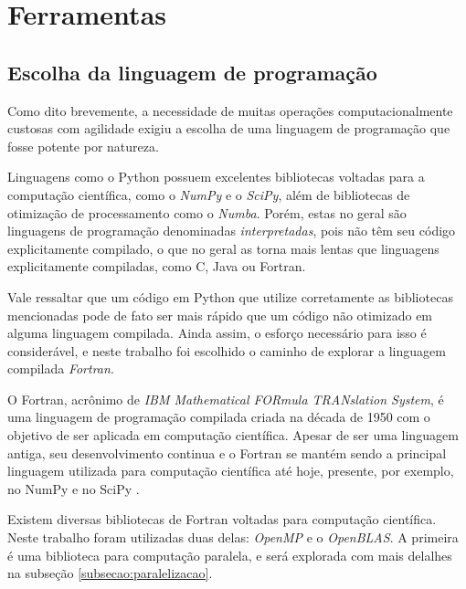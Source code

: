 %   
\section{Ferramentas}

\subsection{Escolha da linguagem de programação}
Como dito brevemente, a necessidade de muitas operações computacionalmente custosas com agilidade exigiu a escolha de uma linguagem de programação que fosse potente por natureza. 

Linguagens como o Python possuem excelentes bibliotecas voltadas para a computação científica, como o \textit{NumPy} e o \textit{SciPy}, além de bibliotecas de otimização de processamento como o \textit{Numba}. Porém, estas no geral são linguagens de programação denominadas \textit{interpretadas}, pois não têm seu código explicitamente compilado, o que no geral as torna mais lentas que linguagens explicitamente compiladas, como C, Java ou Fortran. 

Vale ressaltar que um código em Python que utilize corretamente as bibliotecas mencio\-nadas pode de fato ser mais rápido que um código não otimizado em alguma linguagem compilada. Ainda assim, o esforço necessário para isso é considerável, e neste trabalho foi escolhido o caminho de explorar a linguagem compilada \textit{Fortran}.

O Fortran, acrônimo de \textit{IBM Mathematical FORmula TRANslation System}, é uma linguagem de programação compilada criada na década de 1950 com o objetivo de ser aplicada em computação científica. Apesar de ser uma linguagem antiga, seu desenvolvimento continua e o Fortran se mantém sendo a principal linguagem utilizada para computação científica até hoje, presente, por exemplo, no NumPy e no SciPy \citep{2020NumPy-Array, 2020SciPy-NMeth}.

Existem diversas bibliotecas de Fortran voltadas para computação científica. Neste trabalho foram utilizadas duas delas: \textit{OpenMP} e o \textit{OpenBLAS}. A primeira é uma biblioteca para computação paralela, e será explorada com mais delalhes na subseção \ref{subsecao:paralelizacao}. 

